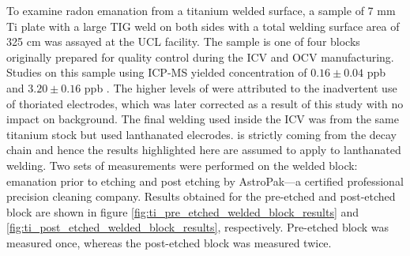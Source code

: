 To examine radon emanation from a titanium welded surface, a sample of 7 mm Ti plate with a large TIG weld on both sides with a total welding surface area of 325 cm\squared{} was assayed at the UCL facility. The sample is one of four blocks originally prepared for quality control during the ICV and OCV manufacturing. Studies on this sample using ICP-MS yielded concentration of $0.16\pm0.04$ ppb \UTTEe{} and $3.20\pm0.16$ ppb \ThTTTe{}. The higher levels of \ThTTTe{} were attributed to the inadvertent use of thoriated electrodes, which was later corrected as a result of this study with no impact on background. The final welding used inside the ICV was from the same titanium stock but used lanthanated elecrodes. \RnTTT{} is strictly coming from the \UTTE{} decay chain and hence the results highlighted here are assumed to apply to lanthanated welding. Two sets of measurements were performed on the welded block: emanation prior to etching and post etching by AstroPak---a certified professional precision cleaning company. Results obtained for the pre-etched and post-etched block are shown in figure \ref{fig:ti_pre_etched_welded_block_results} and \ref{fig:ti_post_etched_welded_block_results}, respectively. Pre-etched block was measured once, whereas the post-etched block was measured twice.
%
